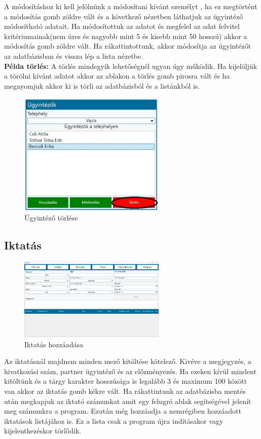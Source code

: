 \documentclass[
]{thesis-ekf}
\theoremstyle{definition}
\theoremstyle{remark}
\begin{document}
A módosításhoz ki kell jelölnünk a módosítani kívánt személyt , ha ez megtörtént a módosítás gomb zöldre vált és a következő nézetben láthatjuk az ügyintéző módosítható adatait. Ha módosítottuk az adatot és megfelel az adat felvitel kritériumainak(nem üres és nagyobb mint 5 és kisebb mint 50 hosszú) akkor a módosítás gomb zöldre vált. Ha rákattintottunk, akkor módosítja az ügyintézőt az adatbázisban és vissza lép a lista nézetbe.\\
\textbf{Példa törlés:}
A törlés mindegyik lehetőségnél ugyan úgy működik. Ha kijelöljük a törölni kívánt adatot akkor az ablakon a törlés gomb pirosra vált és ha megnyomjuk akkor ki is törli az adatbázisból és a listánkból is.
\begin{figure}[h!]
	\centering
	\includegraphics[width=7cm]{dokukepek/ctorzsdelete}
	\caption{Ügyintéző törlése}
	\label{fig:ctorzsdelete}
\end{figure}
\subsection{Iktatás}
\begin{figure}[h!]
	\centering
	\includegraphics[width=7cm]{dokukepek/ciktatas}
	\caption{Iktatás hozzáadása}
	\label{fig:ciktatas}
\end{figure}
Az iktatásnál majdnem minden mező kitöltése kötelező. Kivéve a megjegyzés, a hivatkozási szám, partner ügyintéző és az előzményezés. Ha ezeken kívül mindent kitöltünk és a tárgy karakter hosszúsága is legalább 3 és maximum 100 között van akkor az iktatás gomb kékre vált. Ha rákattintunk az adatbázisba mentés után megkapjuk az iktató számunkat amit egy felugró ablak segítségével jelenít meg számunkra a program. Ezután még hozzáadja a nemrégiben hozzáadott iktatások listájához is. Ez a lista csak a program újra indításakor vagy kijelentkezéskor törlődik.
\end{document}

